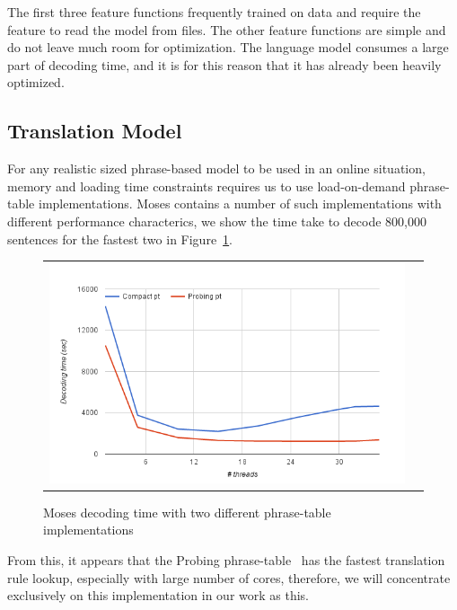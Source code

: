 \documentclass[11pt]{article}
\begin{document}
The first three feature functions frequently trained on data and require the feature to read the model from files. The other feature functions are simple and do not leave much room for optimization. The language model consumes a large part of decoding time, and it is for this reason that it has already been heavily optimized. %

%
\subsection{Translation Model}

For any realistic sized phrase-based model to be used in an online situation, memory and loading time constraints requires us to use load-on-demand phrase-table implementations. Moses contains a number of such implementations with different performance characterics, we show the time take to decode 800,000 sentences for the fastest two in Figure~\ref{fig:moses-phrase-tables-time}.
\begin{figure}[h]
\centering
\begin{tabular}{cc}
{\includegraphics[scale=0.4]{moses-phrase-table.png}} 
\end{tabular}
\caption{Moses decoding time with two different phrase-table implementations}
\label{fig:moses-phrase-tables-time}
\end{figure} 
From this, it appears that the Probing phrase-table~\cite{Bogoychev:Thesis:2013} has the fastest translation rule lookup, especially with large number of cores, therefore, we will concentrate exclusively on this implementation in our work as this.
 
\end{document}
